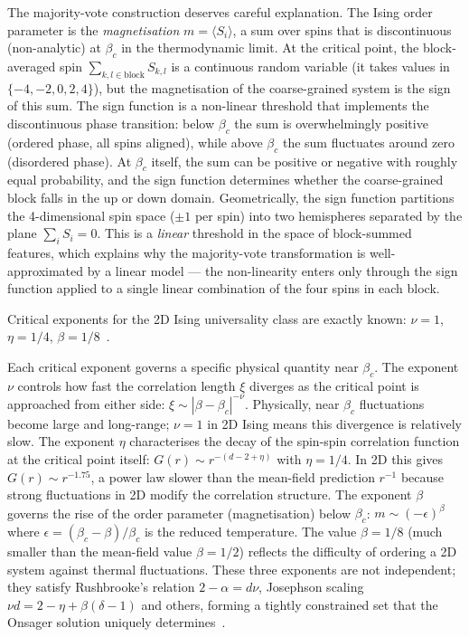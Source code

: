 \documentclass[12pt,a4paper]{memoir}
\begin{document}
The majority-vote construction deserves careful explanation.  The Ising order
parameter is the \emph{magnetisation} $m = \langle S_i \rangle$, a sum over spins
that is discontinuous (non-analytic) at $\beta_c$ in the thermodynamic limit.
At the critical point, the block-averaged spin $\sum_{k,l \in \mathrm{block}} S_{k,l}$
is a continuous random variable (it takes values in $\{-4,-2,0,2,4\}$), but the
magnetisation of the coarse-grained system is the sign of this sum.  The sign
function is a non-linear threshold that implements the discontinuous phase
transition: below $\beta_c$ the sum is overwhelmingly positive (ordered phase,
all spins aligned), while above $\beta_c$ the sum fluctuates around zero
(disordered phase).  At $\beta_c$ itself, the sum can be positive or negative
with roughly equal probability, and the sign function determines whether the
coarse-grained block falls in the up or down domain.  Geometrically, the sign
function partitions the 4-dimensional spin space ($\pm1$ per spin) into two
hemispheres separated by the plane $\sum_i S_i = 0$.  This is a \emph{linear}
threshold in the space of block-summed features, which explains why the
majority-vote transformation is well-approximated by a linear model ---
the non-linearity enters only through the sign function applied to a single
linear combination of the four spins in each block.

Critical exponents for the 2D Ising universality class are exactly known:
$\nu=1$, $\eta=1/4$, $\beta=1/8$~\citep{onsager1944,kadanoff1967,stanley1971}.

Each critical exponent governs a specific physical quantity near $\beta_c$.
The exponent $\nu$ controls how fast the correlation length $\xi$ diverges as
the critical point is approached from either side: $\xi \sim |\beta - \beta_c|^{-\nu}$.
Physically, near $\beta_c$ fluctuations become large and long-range; $\nu=1$
in 2D Ising means this divergence is relatively slow.  The exponent $\eta$
characterises the decay of the spin-spin correlation function at the critical
point itself: $G(r) \sim r^{-(d-2+\eta)}$ with $\eta=1/4$.  In 2D this gives
$G(r) \sim r^{-1.75}$, a power law slower than the mean-field prediction
$r^{-1}$ because strong fluctuations in 2D modify the correlation structure.
The exponent $\beta$ governs the rise of the order parameter (magnetisation)
below $\beta_c$: $m \sim (-\epsilon)^{\beta}$ where $\epsilon = (\beta_c - \beta)/\beta_c$
is the reduced temperature.  The value $\beta=1/8$ (much smaller than the
mean-field value $\beta=1/2$) reflects the difficulty of ordering a 2D system
against thermal fluctuations.  These three exponents are not independent;
they satisfy Rushbrooke's relation $2-\alpha = d\nu$, Josephson scaling
$\nu d = 2-\eta + \beta(\delta-1)$ and others, forming a tightly constrained
set that the Onsager solution uniquely determines~\citep{goldenfeld1992,amit2005}.
\end{document}
